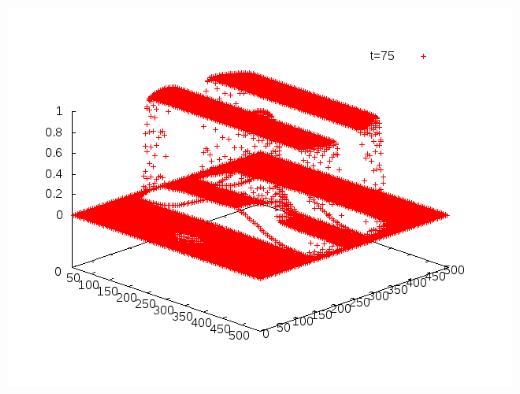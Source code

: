 \documentclass[handout]{beamer}
\begin{document}
\begin{frame}
	\includegraphics[scale=0.2]{img/anim1-80-150.png}
\end{frame}
\end{document}
